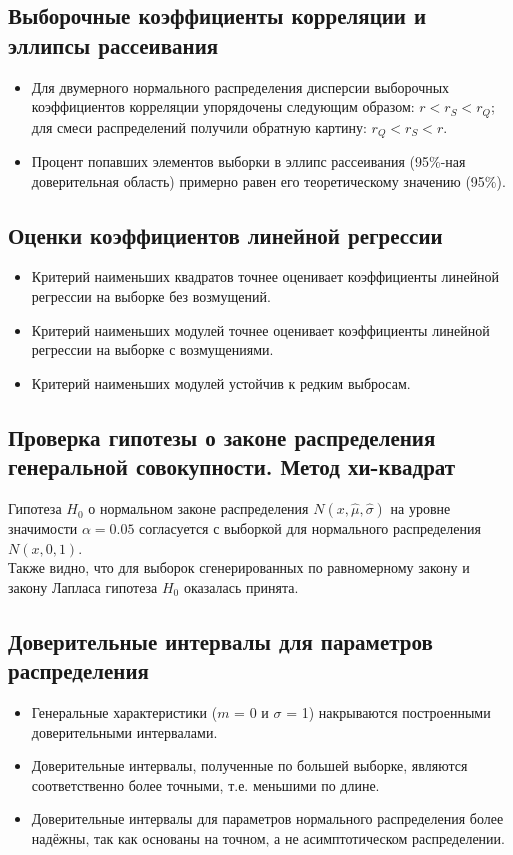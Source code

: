 \documentclass[../main.tex]{subfiles}
\begin{document}
    \subsection{Выборочные коэффициенты корреляции и эллипсы рассеивания}
    \begin{itemize}
        \item Для двумерного нормального распределения дисперсии выборочных коэффициентов корреляции упорядочены следующим образом: $r < r_{S} < r_{Q}$; для смеси распределений получили обратную картину: $r_{Q} < r_{S} < r$.
        \item Процент попавших элементов выборки в эллипс рассеивания (95$\%$-ная доверительная область) примерно равен его теоретическому значению (95$\%$).
    \end{itemize}
    \subsection{Оценки коэффициентов линейной регрессии}
    \begin{itemize}
        \item Критерий наименьших квадратов точнее оценивает коэффициенты линейной регрессии на выборке без возмущений.
        \item Критерий наименьших модулей точнее оценивает коэффициенты линейной регрессии на выборке с возмущениями.
        \item Критерий наименьших модулей устойчив к редким выбросам.
    \end{itemize}

    \subsection{Проверка гипотезы о законе распределения генеральной совокупности. Метод хи-квадрат}
        \noindent Гипотеза $H_{0}$ о нормальном законе распределения $N(x,\hat{\mu}, \hat{\sigma})$ на уровне значимости $\alpha = 0.05$ согласуется с выборкой для нормального распределения $N(x, 0, 1)$.
        \\
        Также видно, что для выборок сгенерированных по равномерному закону и закону Лапласа гипотеза $H_{0}$ оказалась принята.

    \subsection{Доверительные интервалы для параметров распределения}
    \begin{itemize}
        \item Генеральные характеристики ($m$ = 0 и $\sigma$ = 1) накрываются построенными доверительными интервалами. 
        \item Доверительные интервалы, полученные по большей выборке, являются соответственно более точными, т.е. меньшими по длине. 
        \item Доверительные интервалы для параметров нормального распределения более надёжны, так как основаны на точном, а не асимптотическом распределении.
\end{itemize}
\end{document}
